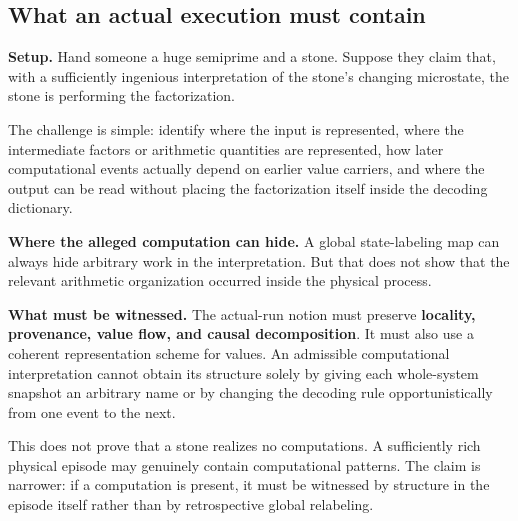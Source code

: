 \documentclass[11pt,a4paper]{article}
\newcounter{thought}
\newenvironment{thoughtbox}[1]{%
  \refstepcounter{thought}%
  \begin{tcolorbox}[
    enhanced,breakable,
    colback=white,colframe=navy,boxrule=0.85pt,
    arc=1.7mm,left=2.8mm,right=2.8mm,top=2.2mm,bottom=2.0mm,
    borderline west={2.2pt}{0pt}{blue},
    title={\large\bfseries Thought experiment \thethought: #1},
    fonttitle=\bfseries,coltitle=navy,
    attach boxed title to top left={xshift=2mm,yshift=-2mm},
    boxed title style={colback=sky,colframe=blue,boxrule=0.55pt,arc=1.2mm},
    before skip=9pt,after skip=10pt
  ]
}{\end{tcolorbox}}
\newcommand{\scene}{\medskip\textbf{Setup.} }
\begin{document}
\subsection{What an actual execution must contain}

\begin{thoughtbox}{The stone that allegedly factors a number}
\scene Hand someone a huge semiprime and a stone. Suppose they claim that, with a sufficiently ingenious interpretation of the stone's changing microstate, the stone is performing the factorization.

The challenge is simple: identify where the input is represented, where the intermediate factors or arithmetic quantities are represented, how later computational events actually depend on earlier value carriers, and where the output can be read without placing the factorization itself inside the decoding dictionary.

\medskip\textbf{Where the alleged computation can hide.} A global state-labeling map can always hide arbitrary work in the interpretation. But that does not show that the relevant arithmetic organization occurred inside the physical process.

\medskip\textbf{What must be witnessed.} The actual-run notion must preserve \textbf{locality, provenance, value flow, and causal decomposition}. It must also use a coherent representation scheme for values. An admissible computational interpretation cannot obtain its structure solely by giving each whole-system snapshot an arbitrary name or by changing the decoding rule opportunistically from one event to the next.

\begin{cautionbox}
This does not prove that a stone realizes no computations. A sufficiently rich physical episode may genuinely contain computational patterns. The claim is narrower: if a computation is present, it must be witnessed by structure in the episode itself rather than by retrospective global relabeling.
\end{cautionbox}
\end{thoughtbox}
\end{document}
